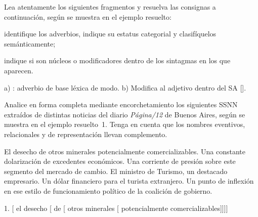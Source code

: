 \begin{ejercicio}\label{ej:05-adverbios}
Lea atentamente los siguientes fragmentos y resuelva las consignas a
continuación, según se muestra en el ejemplo resuelto:

\begin{consignas}
  \item identifique los adverbios, indique su estatus categorial y
        clasifíquelos semánticamente;
  \item indique si son núcleos o modificadores dentro de los sintagmas en los
        que aparecen.
\end{consignas}


\begin{resuelto}
a) : adverbio de base léxica de modo. b) Modifica al adjetivo
 dentro del SA [].
\end{resuelto}
\end{ejercicio}

\begin{ejercicio}\label{ej:05-p12}
Analice en forma completa mediante encorchetamiento los siguientes SSNN
extraídos de distintas noticias del diario \textit{Página/12} de Buenos Aires,
según se muestra en el ejemplo resuelto~1. Tenga en cuenta que los nombres
eventivos, relacionales y de representación llevan complemento.

\begin{exe}
  \ex El desecho de otros minerales potencialmente comercializables.
  \ex Una constante dolarización de excedentes económicos.
  \ex Una corriente de presión sobre este segmento del mercado de cambio.
  \ex El ministro de Turismo, un destacado empresario.
  \ex Un dólar financiero para el turista extranjero.
  \ex Un punto de inflexión en ese estilo de funcionamiento político de la
      coalición de gobierno.
\end{exe}

\begin{resuelto}
1. [ el desecho [ de
[ otros minerales [
potencialmente comercializables]]]]
\end{resuelto}
\end{ejercicio}

